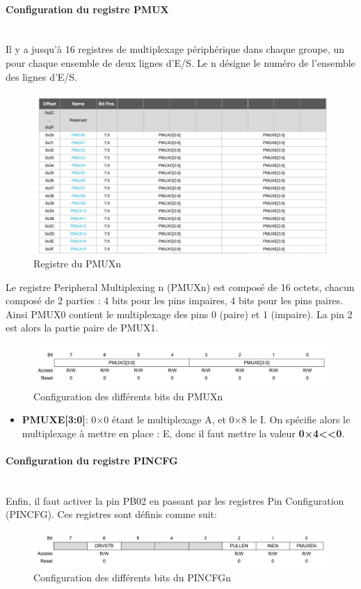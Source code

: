 \documentclass[a4paper]{article}
\begin{document}
	\paragraph{Configuration du registre PMUX} 
	~~\\
	Il y a jusqu'à 16 registres de multiplexage périphérique dans chaque groupe, un pour chaque ensemble de deux lignes d'E/S. Le n désigne le numéro de l'ensemble des lignes d'E/S.\\
	\begin{figure}[H]
		\centering
		\includegraphics[width=0.9\linewidth]{Registre du PMUXn.jpg}
		\caption{Registre du PMUXn}
	\end{figure}
	Le registre  Peripheral Multiplexing n (PMUXn) est composé de 16 octets, chacun composé de 2 parties : 4 bits pour les pins impaires, 4 bits pour les pins paires. Ainsi PMUX0 contient le multiplexage des pins 0 (paire) et 1 (impaire). La pin 2 est alors la partie paire de PMUX1.  
	\begin{figure}[H]
		\centering
		\includegraphics[width=0.9\linewidth]{PMUX.jpg}
		\caption{Configuration des différents bits du PMUXn}
	\end{figure}
	
	\begin{itemize}
		\item {\bf PMUXE[3:0]}: 0×0 étant le multiplexage A, et 0×8 le I. On spécifie alors le multiplexage à mettre en place : E, donc il faut mettre la valeur {\bf 0×4\textless\textless0}.
	\end{itemize}
	
	\paragraph{Configuration du registre PINCFG} 
	~~\\
	Enfin, il faut activer la pin PB02 en passant par les registres Pin Configuration (PINCFG). Ces registres sont définis comme suit:   
	\begin{figure}[H]
		\centering
		\includegraphics[width=0.9\linewidth]{PINCFGn.jpg}
		\caption{Configuration des différents bits du PINCFGn}
	\end{figure}
	
\end{document}
